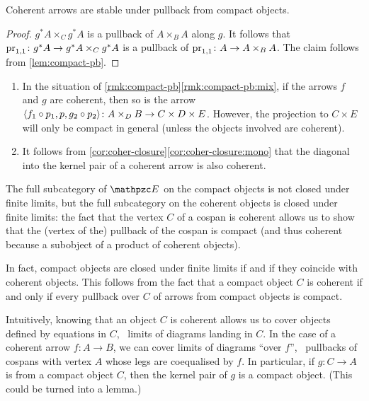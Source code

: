 \documentclass[a4paper,11pt]{amsart}
\begin{document}
\begin{cor}\label{cor:coher-pb}
	Coherent arrows are stable under pullback from compact objects.
\end{cor}

\begin{proof}
	$g^*A \times_C g^*A$ is a pullback of $A \times_B A$ along $g$.
	It follows that ${\mathrm{pr}}_{1,1}\colon g^*A\to g^*A \times_C g^*A$ is a pullback of ${\mathrm{pr}}_{1,1}\colon A\to A\times_BA$.
	The claim follows from \cref{lem:compact-pb}.
\end{proof}

\begin{rmk}\label{rmk:coher}
\hfill
\begin{enumerate}
	\item\label{rmk:coher:pbmix}
	In the situation of \cref{rmk:compact-pb}\eqref{rmk:compact-pb:mix},
	if the arrows $f$ and $g$ are coherent, then so is the arrow
	$\langle{f_1\mathbin{\circ}p_1,p,g_2\mathbin{\circ}p_2}\rangle\colon A\times_DB\to C\times D\times E$.
	However, the projection to $C\times E$ will only be compact in general (unless the objects involved are coherent).
	\item\label{rmk:coher:diag}
	It follows from \cref{cor:coher-closure}\eqref{cor:coher-closure:mono}
	that the diagonal into the kernel pair of a coherent arrow is also coherent.
\end{enumerate}
\end{rmk}

\begin{rmk}\label{rmk:coher-lim}
	The full subcategory of $\Ecat$ on the compact objects is not closed under finite limits, but the full subcategory on the coherent objects is closed under finite limits:
	the fact that the vertex $C$ of a cospan is coherent allows us to show that the (vertex of the) pullback of the cospan is compact (and thus coherent because a subobject of a product of coherent objects).
	
	In fact, compact objects are closed under finite limits if and if they coincide with coherent objects.
	This follows from the fact that a compact object $C$ is coherent if and only if every pullback over $C$ of arrows from compact objects is compact.
	
	Intuitively, knowing that an object $C$ is coherent allows us to cover objects defined by equations in $C$, \ie~limits of diagrams landing in $C$.
	In the case of a coherent arrow $f\colon A\to B$, we can cover limits of diagrams ``over $f$'',
	\eg~pullbacks of cospans with vertex $A$ whose legs are coequalised by $f$.
	In particular, if $g\colon C\to A$ is from a compact object $C$, then the kernel pair of $g$ is a compact object. (This could be turned into a lemma.)
\end{rmk}
\end{document}
